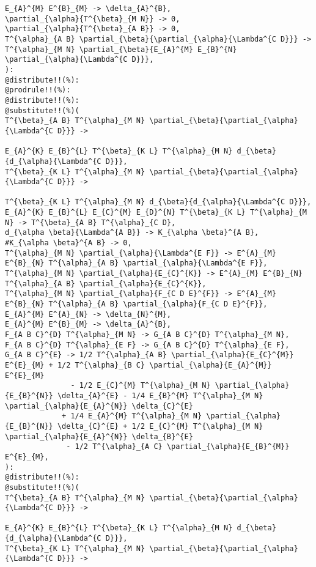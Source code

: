 \documentclass[11pt]{article}
\begin{document}
{\begin{verbatim}
E_{A}^{M} E^{B}_{M} -> \delta_{A}^{B},
\partial_{\alpha}{T^{\beta}_{M N}} -> 0,
\partial_{\alpha}{T^{\beta}_{A B}} -> 0,
T^{\alpha}_{A B} \partial_{\beta}{\partial_{\alpha}{\Lambda^{C D}}} -> T^{\alpha}_{M N} \partial_{\beta}{E_{A}^{M} E_{B}^{N} \partial_{\alpha}{\Lambda^{C D}}},
):
@distribute!!(%):
@prodrule!!(%):
@distribute!!(%):
@substitute!!(%)(
T^{\beta}_{A B} T^{\alpha}_{M N} \partial_{\beta}{\partial_{\alpha}{\Lambda^{C D}}} -> 
                                                                                      E_{A}^{K} E_{B}^{L} T^{\beta}_{K L} T^{\alpha}_{M N} d_{\beta}{d_{\alpha}{\Lambda^{C D}}},
T^{\beta}_{K L} T^{\alpha}_{M N} \partial_{\beta}{\partial_{\alpha}{\Lambda^{C D}}} -> 
                                                                                                                             T^{\beta}_{K L} T^{\alpha}_{M N} d_{\beta}{d_{\alpha}{\Lambda^{C D}}},
E_{A}^{K} E_{B}^{L} E_{C}^{M} E_{D}^{N} T^{\beta}_{K L} T^{\alpha}_{M N} -> T^{\beta}_{A B} T^{\alpha}_{C D},
d_{\alpha \beta}{\Lambda^{A B}} -> K_{\alpha \beta}^{A B},
#K_{\alpha \beta}^{A B} -> 0,
T^{\alpha}_{M N} \partial_{\alpha}{\Lambda^{E F}} -> E^{A}_{M} E^{B}_{N} T^{\alpha}_{A B} \partial_{\alpha}{\Lambda^{E F}},
T^{\alpha}_{M N} \partial_{\alpha}{E_{C}^{K}} -> E^{A}_{M} E^{B}_{N} T^{\alpha}_{A B} \partial_{\alpha}{E_{C}^{K}},
T^{\alpha}_{M N} \partial_{\alpha}{F_{C D E}^{F}} -> E^{A}_{M} E^{B}_{N} T^{\alpha}_{A B} \partial_{\alpha}{F_{C D E}^{F}},
E_{A}^{M} E^{A}_{N} -> \delta_{N}^{M},
E_{A}^{M} E^{B}_{M} -> \delta_{A}^{B},
F_{A B C}^{D} T^{\alpha}_{M N} -> G_{A B C}^{D} T^{\alpha}_{M N},
F_{A B C}^{D} T^{\alpha}_{E F} -> G_{A B C}^{D} T^{\alpha}_{E F},
G_{A B C}^{E} -> 1/2 T^{\alpha}_{A B} \partial_{\alpha}{E_{C}^{M}} E^{E}_{M} + 1/2 T^{\alpha}_{B C} \partial_{\alpha}{E_{A}^{M}} E^{E}_{M}
               - 1/2 E_{C}^{M} T^{\alpha}_{M N} \partial_{\alpha}{E_{B}^{N}} \delta_{A}^{E} - 1/4 E_{B}^{M} T^{\alpha}_{M N} \partial_{\alpha}{E_{A}^{N}} \delta_{C}^{E}
             + 1/4 E_{A}^{M} T^{\alpha}_{M N} \partial_{\alpha}{E_{B}^{N}} \delta_{C}^{E} + 1/2 E_{C}^{M} T^{\alpha}_{M N} \partial_{\alpha}{E_{A}^{N}} \delta_{B}^{E}
              - 1/2 T^{\alpha}_{A C} \partial_{\alpha}{E_{B}^{M}} E^{E}_{M},
):
@distribute!!(%):
@substitute!!(%)(
T^{\beta}_{A B} T^{\alpha}_{M N} \partial_{\beta}{\partial_{\alpha}{\Lambda^{C D}}} -> 
                                                                                      E_{A}^{K} E_{B}^{L} T^{\beta}_{K L} T^{\alpha}_{M N} d_{\beta}{d_{\alpha}{\Lambda^{C D}}},
T^{\beta}_{K L} T^{\alpha}_{M N} \partial_{\beta}{\partial_{\alpha}{\Lambda^{C D}}} -> 

\end{verbatim}}
\end{document}
